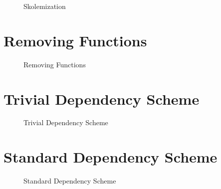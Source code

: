 \begin{figure}[H]
\caption{Skolemization}
\begin{CenteredBox}

\end{CenteredBox}
\end{figure}

\section{Removing Functions}

\begin{figure}[H]
\caption{Removing Functions}
\begin{CenteredBox}

\end{CenteredBox}
\end{figure}

\section{Trivial Dependency Scheme}

\begin{figure}[H]
\caption{Trivial Dependency Scheme}
\begin{CenteredBox}

\end{CenteredBox}
\end{figure}

\section{Standard Dependency Scheme}

\begin{figure}[H]
\caption{Standard Dependency Scheme}
\begin{CenteredBox}

\end{CenteredBox}
\end{figure}
